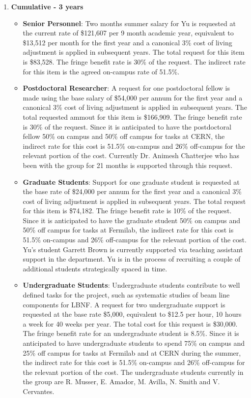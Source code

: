 \begin{enumerate}
\item{\bf Cumulative - 3 years}

\begin{itemize}[noitemsep,nolistsep]
\item{{\bf Senior Personnel}: Two months summer salary for Yu is requested at the current rate of \$121,607 per 9 month academic year, equivalent to \$13,512 per month for the first year and a canonical 3\% cost of living adjustment is applied in subsequent years.  The total request for this item is \$83,528. The fringe benefit rate is 30\% of the request.  The indirect rate for this item is the agreed on-campus rate of 51.5\%.}

\item {{\bf Postdoctoral Researcher}: A request for one postdoctoral fellow is made using the base salary of \$54,000 per annum for the first year and a canonical 3\% cost of living adjustment is applied in subsequent years.  The total requested ammout for this item is \$166,909. The fringe benefit rate is 30\% of the request.  Since it is anticipated to have the postdoctoral fellow 50\% on campus and 50\% off campus for tasks at CERN, the indirect rate for this cost is 51.5\% on-campus and 26\% off-campus for the relevant portion of the cost.  Currently Dr. Animesh Chatterjee who has been with the group for 21 months is supported through this request.} 

\item{{\bf Graduate Students}: Support for one graduate student is requested at the base rate of \$24,000 per annum for the first year and a canonical 3\% cost of living adjustment is applied in subsequent years. The total request for this item is \$74,182.  The fringe benefit rate is 10\% of the request.  Since it is anticipated to have the graduate student 50\% on campus and 50\% off campus for tasks at Fermilab, the indirect rate for this cost is 51.5\% on-campus and 26\% off-campus for the relevant portion of the cost.   Yu’s student Garrett Brown is currently supported via teaching assistant support in the department.   Yu is in the process of recruiting a couple of additional students strategically spaced in time.}

\item {{\bf Undergraduate Students}: Undergraduate students contribute to well defined tasks for the project, such as systematic studies of beam line components for LBNF.  A request for two undergraduate support is requested at the base rate \$5,000, equivalent to \$12.5 per hour, 10 hours a week for 40 weeks per year.  The total cost for this request is \$30,000.  The fringe benefit rate for an undergraduate student is 8.5\%.  Since it is anticipated to have undergraduate students to spend 75\% on campus and 25\% off campus for tasks at Fermilab and at CERN during the summer, the indirect rate for this cost is 51.5\% on-campus and 26\% off-campus for the relevant portion of the cost.   The undergraduate students currently in the group are R. Musser,  E. Amador, M. Avilla, N. Smith and V. Cervantes.}


\end{itemize}
\end{enumerate}
